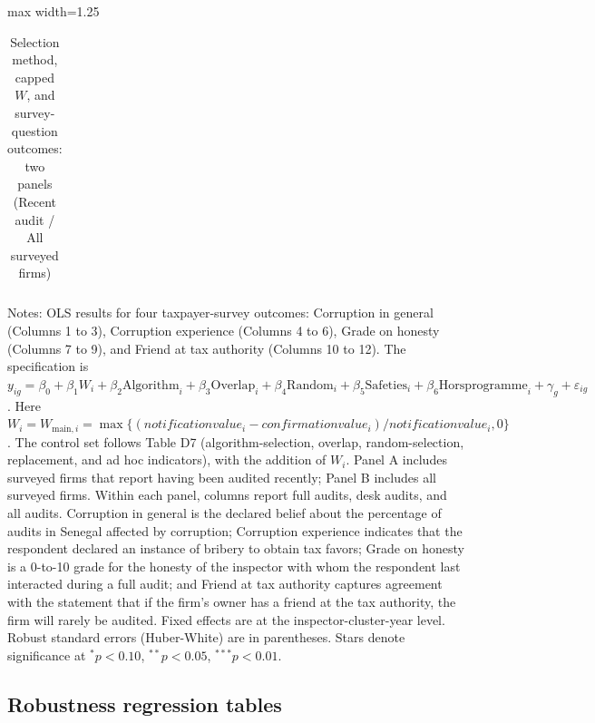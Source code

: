 \documentclass{article}
\newcommand{\OutPath}{Output/}%
\newcommand{\OutPath}{../Output/}%
\begin{document}
\begin{landscape}
\begin{table}[!htbp]
\centering
\begin{adjustbox}{max width=1.25\textwidth}
\begin{threeparttable}
\caption{Selection method, capped \(W\), and survey-question outcomes: two panels (Recent audit / All surveyed firms)}
\begin{tabular}{l*{12}{c}}

\end{tabular}
\begin{tablenotes}[flushleft]
\footnotesize
\item Notes: OLS results for four taxpayer-survey outcomes: Corruption in general (Columns 1 to 3), Corruption experience (Columns 4 to 6), Grade on honesty (Columns 7 to 9), and Friend at tax authority (Columns 10 to 12). The specification is \(y_{ig}=\beta_0+\beta_1 W_i+\beta_2 \text{Algorithm}_i+\beta_3 \text{Overlap}_i+\beta_4 \text{Random}_i+\beta_5 \text{Safeties}_i+\beta_6 \text{Horsprogramme}_i+\gamma_g+\varepsilon_{ig}\). Here \(W_i=W_{\text{main},i}=\max\{(notificationvalue_i-confirmationvalue_i)/notificationvalue_i,0\}\). The control set follows Table D7 (algorithm-selection, overlap, random-selection, replacement, and ad hoc indicators), with the addition of \(W_i\). Panel A includes surveyed firms that report having been audited recently; Panel B includes all surveyed firms. Within each panel, columns report full audits, desk audits, and all audits. Corruption in general is the declared belief about the percentage of audits in Senegal affected by corruption; Corruption experience indicates that the respondent declared an instance of bribery to obtain tax favors; Grade on honesty is a 0-to-10 grade for the honesty of the inspector with whom the respondent last interacted during a full audit; and Friend at tax authority captures agreement with the statement that if the firm's owner has a friend at the tax authority, the firm will rarely be audited. Fixed effects are at the inspector-cluster-year level. Robust standard errors (Huber-White) are in parentheses. Stars denote significance at \(^{*}p<0.10\), \(^{**}p<0.05\), \(^{***}p<0.01\).
\end{tablenotes}
\end{threeparttable}
\end{adjustbox}
\end{table}
\end{landscape}

\subsection{Robustness regression tables}
\end{document}
